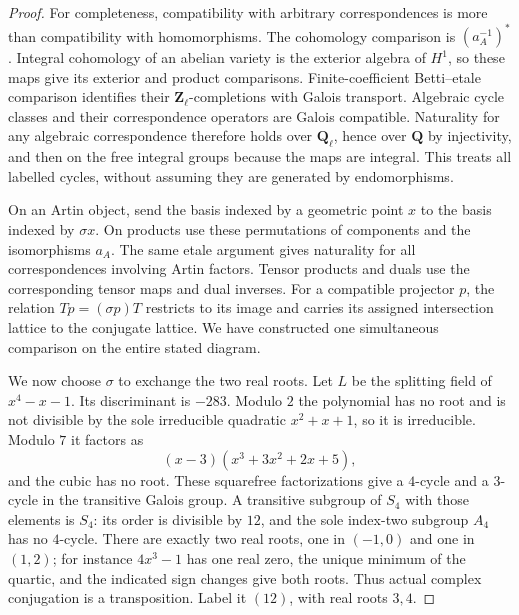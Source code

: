\documentclass[11pt]{article}
\theoremstyle{definition}\newtheorem{definition}[theorem]{Definition}
\theoremstyle{remark}\newtheorem{remark}[theorem]{Remark}
\newcommand{\Q}{\mathbf Q}\newcommand{\Z}{\mathbf Z}
\begin{document}
\begin{proof}
For completeness, compatibility with arbitrary correspondences is more
than compatibility with homomorphisms. The cohomology comparison is
$(a_A^{-1})^*$. Integral cohomology of an abelian variety is the exterior
algebra of $H^1$, so these maps give its exterior and product
comparisons. Finite-coefficient Betti--etale comparison
\cite[Expos\'e~XVI, Theorem~4.1]{SGAComparison} identifies their
$\Z_\ell$-completions with Galois transport. Algebraic cycle classes
and their correspondence operators are Galois compatible. Naturality
for any algebraic correspondence therefore holds over $\Q_\ell$,
hence over $\Q$ by injectivity, and then on the free integral groups
because the maps are integral. This treats all labelled cycles,
without assuming they are generated by endomorphisms.

On an Artin object, send the basis indexed by a geometric point $x$
to the basis indexed by $\sigma x$. On products use these permutations
of components and the isomorphisms $a_A$. The same etale argument gives
naturality for all correspondences involving Artin factors. Tensor
products and duals use the corresponding tensor maps and dual inverses.
For a compatible projector $p$, the relation $Tp=(\sigma p)T$ restricts
to its image and carries its assigned intersection lattice to the
conjugate lattice. We have constructed one simultaneous comparison on
the entire stated diagram.

We now choose $\sigma$ to exchange the two real roots. Let $L$ be the
splitting field of $x^4-x-1$. Its discriminant is $-283$. Modulo $2$
the polynomial has no root and is not divisible by the sole irreducible
quadratic $x^2+x+1$, so it is irreducible. Modulo $7$ it factors as
\[
       (x-3)(x^3+3x^2+2x+5),
\]
and the cubic has no root. These squarefree factorizations give a
$4$-cycle and a $3$-cycle in the transitive Galois group. A transitive
subgroup of $S_4$ with those elements is $S_4$: its order is divisible
by $12$, and the sole index-two subgroup $A_4$ has no $4$-cycle.
There are exactly two real roots, one in $(-1,0)$ and one in $(1,2)$;
for instance $4x^3-1$ has one real zero, the unique minimum of the
quartic, and the indicated sign changes give both roots. Thus actual
complex conjugation is a transposition. Label it $(12)$, with real
roots $3,4$.


\end{proof}
\end{document}
